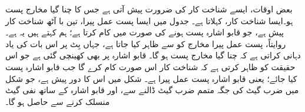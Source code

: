 بعض اوقات، ایسے شناخت کار کی ضرورت پیش آتی ہے جس کا چنا گیا مخارج پست ہو۔ایسا شناخت کار، کہلاتا ہے۔ جدول  میں ایسا پست عمل پیرا، تین با آٹھ شناخت کار پیش ہے، جو قابو اشارہ  پست ہونے کی صورت میں کام کرتا ہے؛ ہم کہتے ہیں یہ  ہے۔ روایتاً، پست عمل پیرا مخارج کو  سے ظاہر کیا جاتا ہے، جہاں بِٹ پر  اس بات کی یاد دہانی کراتی ہے کہ چنا گیا مخارج پست ہو گا۔ قابو اشارہ پر بھی  کھینچی گئی ہے  جو اس حقیقت کو ظاہر کرتی ہے کہ شناخت کار اس صورت کام کرے گا جب قابو اشارہ پست کیا جائے؛ یعنی قابو اشارہ پست عمل پیرا ہے۔ شکل  میں اس کا دور پیش ہے، جو  شکل  میں ضرب گیٹ کی جگہ متمم ضرب گیٹ ڈالنے سے، اور قابو اشارہ کے ساتھ نفی گیٹ منسلک کرنے سے حاصل ہو گا۔
 
